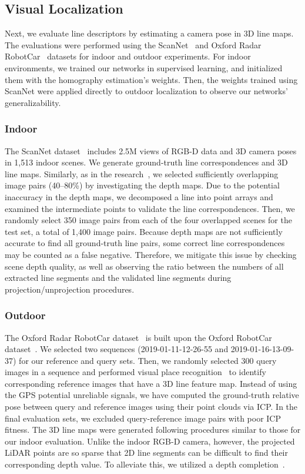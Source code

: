 \documentclass[letterpaper, 10 pt, journal, twoside]{ieeetran}
\begin{document}
\subsection{Visual Localization}

Next, we evaluate line descriptors by estimating a camera pose in 3D line maps. The evaluations were performed using the ScanNet~\cite{Dai2017} and Oxford Radar RobotCar~\cite{Dan2019} datasets for indoor and outdoor experiments. For indoor environments, we trained our networks in supervised learning, and initialized them with the homography estimation's weights. Then, the weights trained using ScanNet were applied directly to outdoor localization to observe our networks' generalizability.



\subsubsection{Indoor}

The ScanNet dataset~\cite{Dai2017} includes 2.5M views of RGB-D data and 3D camera poses in 1,513 indoor scenes. We generate ground-truth line correspondences and 3D line maps. Similarly, as in the research~\cite{Dusmanu2019, Sarlin2019}, we selected sufficiently overlapping image pairs (40--80\%) by investigating the depth maps. Due to the potential inaccuracy in the depth maps, we decomposed a line into point arrays and examined the intermediate points to validate the line correspondences. Then, we randomly select 350 image pairs from each of the four overlapped scenes for the test set, a total of 1,400 image pairs. Because depth maps are not sufficiently accurate to find all ground-truth line pairs, some correct line correspondences may be counted as a false negative. Therefore, we mitigate this issue by checking scene depth quality, as well as observing the ratio between the numbers of all extracted line segments and the validated line segments during projection{\slash}unprojection procedures.

\subsubsection{Outdoor}

The Oxford Radar RobotCar dataset~\cite{Dan2019} is built upon the Oxford RobotCar dataset~\cite{Will2017}. We selected two sequences (2019-01-11-12-26-55 and 2019-01-16-13-09-37) for our reference and query sets. Then, we randomly selected 300 query images in a sequence and performed visual place recognition~\cite{Revaud2019_APGeM} to identify corresponding reference images that have a 3D line feature map. Instead of using the \ac{GPS} potential unreliable signals, we have computed the ground-truth relative pose between query and reference images using their point clouds via \ac{ICP}. In the final evaluation sets, we excluded query-reference image pairs with poor \ac{ICP} fitness. The 3D line maps were generated following procedures similar to those for our indoor evaluation. Unlike the indoor RGB-D camera, however, the projected LiDAR points are so sparse that 2D line segments can be difficult to find their corresponding depth value. To alleviate this, we utilized a depth completion~\cite{Park20}.
\end{document}
